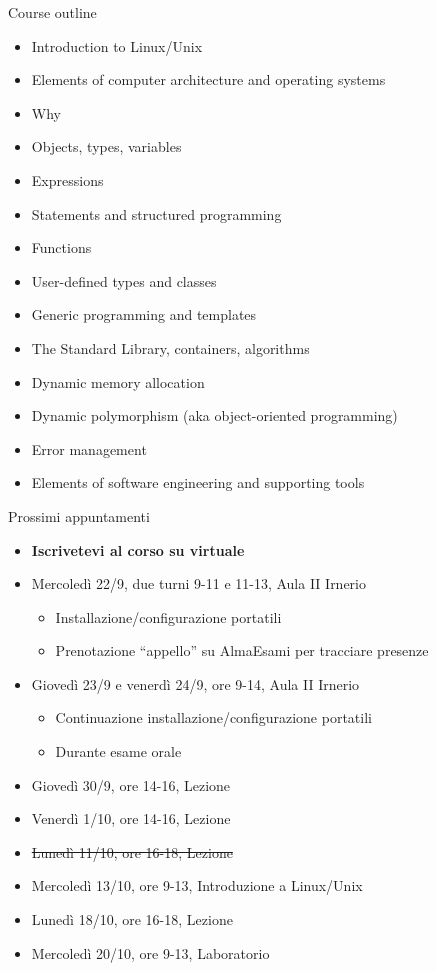 \begin{frame}{Course outline}
  \begin{itemize}
  \item<1-> Introduction to Linux/Unix
  \item<2-> Elements of computer architecture and operating systems
  \item<3-> Why \Cpp{}
  \item<4-> Objects, types, variables
  \item<4-> Expressions
  \item<4-> Statements and structured programming
  \item<4-> Functions
  \item<4-> User-defined types and classes
  \item<4-> Generic programming and templates
  \item<4-> The Standard Library, containers, algorithms
  \item<4-> Dynamic memory allocation
  \item<4-> Dynamic polymorphism (aka object-oriented programming)
  \item<4-> Error management
  \item<5-> Elements of software engineering and supporting tools
  \end{itemize}
\end{frame}

\begin{frame}{Prossimi appuntamenti}
  \begin{itemize}
  \item \textbf{Iscrivetevi al corso su virtuale}
  \item Mercoledì 22/9, due turni 9-11 e 11-13, Aula II Irnerio
    \begin{itemize}
    \item Installazione/configurazione portatili
    \item Prenotazione ``appello'' su AlmaEsami per tracciare presenze
    \end{itemize}

  \item Giovedì 23/9 e venerdì 24/9, ore 9-14, Aula II Irnerio
    \begin{itemize}
    \item Continuazione installazione/configurazione portatili
    \item Durante esame orale
    \end{itemize}

  \item Giovedì 30/9, ore 14-16, Lezione
  \item Venerdì 1/10, ore 14-16, Lezione
  \item \sout{Lunedì 11/10, ore 16-18, Lezione}
  \item Mercoledì 13/10, ore 9-13, Introduzione a Linux/Unix
  \item Lunedì 18/10, ore 16-18, Lezione
  \item Mercoledì 20/10, ore 9-13, Laboratorio

  \end{itemize}
\end{frame}
